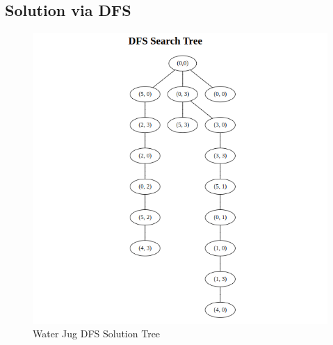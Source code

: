 \documentclass[12pt]{article}
\begin{document}
\subsection{Solution via DFS}
\begin{figure}[h]
  \centerline{\includegraphics[width = 150mm]{WaterJug_DFS.png}}
  \caption{Water Jug DFS Solution Tree}
  \label{fig}
\end{figure}
\end{document}
